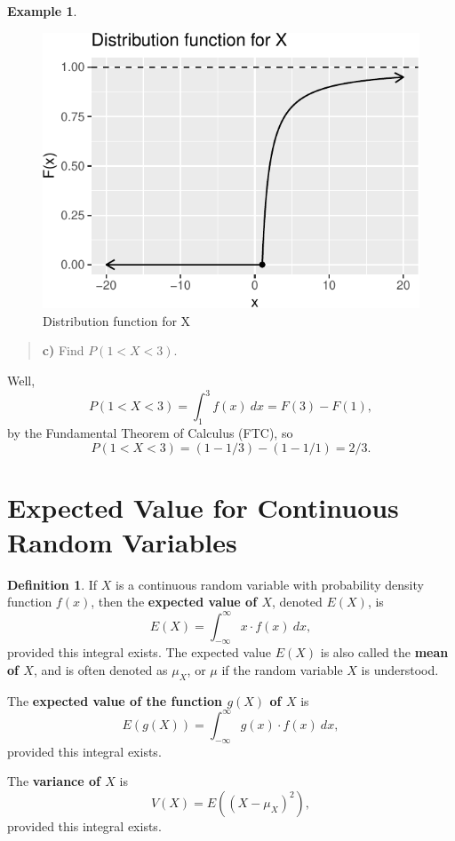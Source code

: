 \documentclass[
]{book}
\theoremstyle{definition}
\newtheorem{definition}{Definition}[chapter]
\theoremstyle{definition}
\newtheorem{example}{Example}[chapter]
\theoremstyle{definition}
\theoremstyle{definition}
\theoremstyle{remark}
\begin{document}
\begin{example}
\begin{figure}
\centering
\includegraphics{math340-notes_files/figure-latex/unnamed-chunk-16-1.pdf}
\caption{\label{fig:unnamed-chunk-16}Distribution function for X}
\end{figure}

\begin{quote}
\textbf{c)} Find \(P(1 < X < 3).\)
\end{quote}

Well, \[P(1 < X < 3) = \int_1^3 f(x)~dx = F(3)-F(1),\] by the Fundamental Theorem of Calculus (FTC), so \[P(1 < X < 3) = (1 - 1/3) - (1 - 1/1) = 2/3.\]
\end{example}

\section{Expected Value for Continuous Random Variables}\label{expected-value-for-continuous-random-variables}

\begin{definition}
\protect\hypertarget{def:expected-value-continuous}{}\label{def:expected-value-continuous}If \(X\) is a continuous random variable with probability density function \(f(x)\), then the \textbf{expected value of \(X\)}, denoted \(E(X)\), is \[E(X) = \int_{-\infty}^\infty x \cdot f(x)~dx,\] provided this integral exists. The expected value \(E(X)\) is also called the \textbf{mean of \(X\)}, and is often denoted as \(\mu_X\), or \(\mu\) if the random variable \(X\) is understood.

The \textbf{expected value of the function \(g(X)\) of \(X\)} is \[E(g(X)) = \int_{-\infty}^\infty g(x) \cdot f(x)~dx,\] provided this integral exists.

The \textbf{variance of \(X\)} is \[V(X) = E((X-\mu_X)^2),\] provided this integral exists.
\end{definition}
\end{document}
